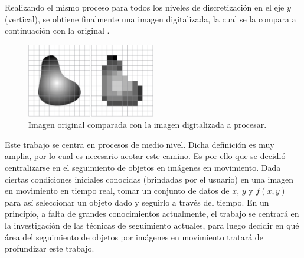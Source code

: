 Realizando el mismo proceso para todos los niveles de discretización en el eje $y$ (vertical), se obtiene finalmente una imagen digitalizada, la cual se la compara a continuación con la original \cite{ref:digit1}.
\begin{figure}[H]
\centering
	\includegraphics[width=0.5\textwidth]{Imagenes/Digitalizacion_3.png}
	\caption{Imagen original comparada con la imagen digitalizada a procesar.}
	\label{fig:disc3}
\end{figure}


	Este trabajo se centra en procesos de medio nivel. Dicha definición es muy amplia, por lo cual es necesario acotar este camino. Es por ello que se decidió centralizarse en el seguimiento de objetos en imágenes en movimiento. Dada ciertas condiciones iniciales conocidas (brindadas por el usuario) en una imagen en movimiento en tiempo real, tomar un conjunto de datos de $x$, $y$ y $f(x,y)$ para así seleccionar un objeto dado y seguirlo a través del tiempo. En un principio, a falta de grandes conocimientos actualmente, el trabajo se centrará en la investigación de las técnicas de seguimiento actuales, para luego decidir en qué área del seguimiento de objetos por imágenes en movimiento tratará de profundizar este trabajo.
	

